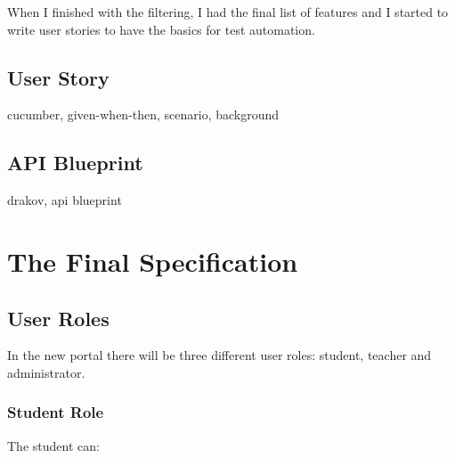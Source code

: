 When I finished with the filtering, I had the final list of features  and I started to write user stories to have the basics for test automation.

\subsection{User Story}

 cucumber, given-when-then, scenario, background

\subsection{API Blueprint}

drakov, api blueprint

\section{The Final Specification} \label{final-spec}
\subsection{User Roles}

In the new portal there will be three different user roles: student, teacher and administrator. 

\subsubsection{Student Role}

The student can:

